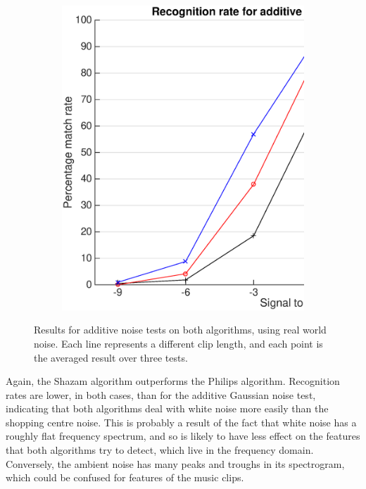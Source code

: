 \documentclass[12pt,a4paper,twoside,openright]{report}
\begin{document}
\begin{figure}[p]
    \begin{subfigure}{\textwidth}
      \includegraphics[width=\textwidth]{./figs/natural_shazam_results.eps} 
    \end{subfigure}

    \vspace{15mm}

    \caption{Results for additive noise tests on both algorithms, using real world noise. Each line represents a different clip length, and each point is the averaged result over three tests.}
    \label{fig:natural_results}
\end{figure}

Again, the Shazam algorithm outperforms the Philips algorithm. Recognition rates are lower, in both cases, than for the additive Gaussian noise test, indicating that both algorithms deal with white noise more easily than the shopping centre noise. This is probably a result of the fact that white noise has a roughly flat frequency spectrum, and so is likely to have less effect on the features that both algorithms try to detect, which live in the frequency domain. Conversely, the ambient noise has many peaks and troughs in its spectrogram, which could be confused for features of the music clips.
\end{document}
